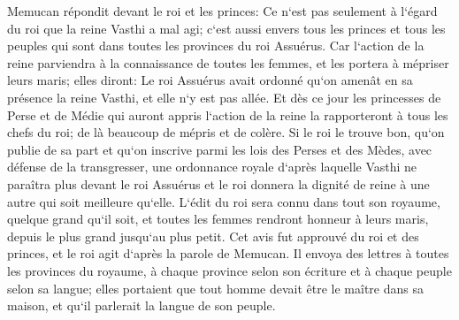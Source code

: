 \verse Memucan répondit devant le roi et les princes: Ce n`est pas seulement à l`égard du roi que la reine Vasthi a mal agi; c`est aussi envers tous les princes et tous les peuples qui sont dans toutes les provinces du roi Assuérus. 
\verse Car l`action de la reine parviendra à la connaissance de toutes les femmes, et les portera à mépriser leurs maris; elles diront: Le roi Assuérus avait ordonné qu`on amenât en sa présence la reine Vasthi, et elle n`y est pas allée. 
\verse Et dès ce jour les princesses de Perse et de Médie qui auront appris l`action de la reine la rapporteront à tous les chefs du roi; de là beaucoup de mépris et de colère. 
\verse Si le roi le trouve bon, qu`on publie de sa part et qu`on inscrive parmi les lois des Perses et des Mèdes, avec défense de la transgresser, une ordonnance royale d`après laquelle Vasthi ne paraîtra plus devant le roi Assuérus et le roi donnera la dignité de reine à une autre qui soit meilleure qu`elle. 
\verse L`édit du roi sera connu dans tout son royaume, quelque grand qu`il soit, et toutes les femmes rendront honneur à leurs maris, depuis le plus grand jusqu`au plus petit. 
\verse Cet avis fut approuvé du roi et des princes, et le roi agit d`après la parole de Memucan. 
\verse Il envoya des lettres à toutes les provinces du royaume, à chaque province selon son écriture et à chaque peuple selon sa langue; elles portaient que tout homme devait être le maître dans sa maison, et qu`il parlerait la langue de son peuple. 

